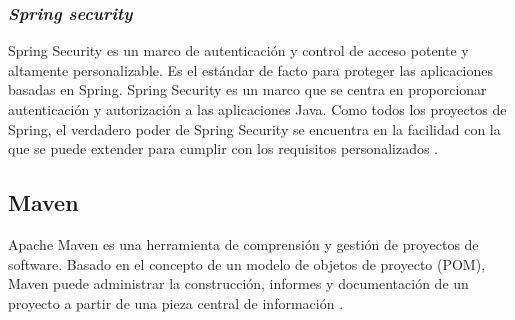 \begin{spacing}{1.5}
		\subsubsection{\textit{Spring security}}
			Spring Security es un marco de autenticación y control de acceso potente y altamente personalizable. Es el estándar de facto para proteger las aplicaciones basadas en Spring.
			Spring Security es un marco que se centra en proporcionar autenticación y autorización a las aplicaciones Java. Como todos los proyectos de Spring, el verdadero poder de Spring Security se encuentra en la facilidad con la que se puede extender para cumplir con los requisitos personalizados \cite{chap2_spring_security}.
	\subsection{Maven}
		Apache Maven es una herramienta de comprensión y gestión de proyectos de software. Basado en el concepto de un modelo de objetos de proyecto (POM), Maven puede administrar la construcción, informes y documentación de un proyecto a partir de una pieza central de información \cite{chap2_maven}.

\end{spacing}
